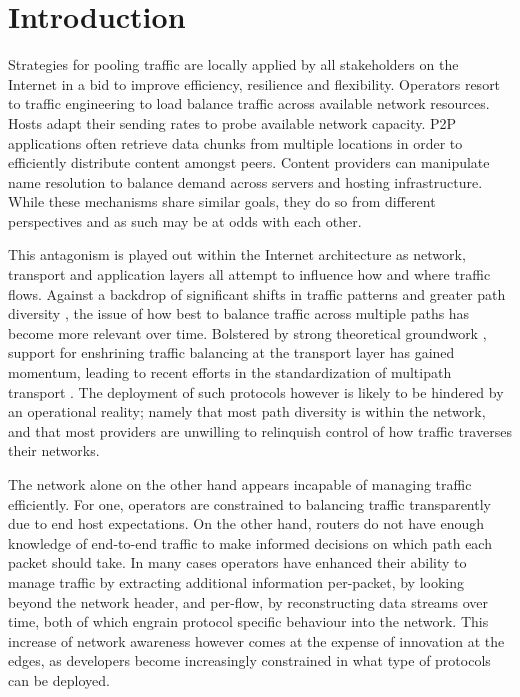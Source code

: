 \chapter{Introduction}
\label{sec:introduction}

Strategies for pooling traffic are locally applied by all stakeholders on the Internet in a bid to improve efficiency, resilience and flexibility.
Operators resort to traffic engineering to load balance traffic across available network resources. 
Hosts adapt their sending rates to probe available network capacity.
\ac{P2P} applications often retrieve data chunks from multiple locations in order to efficiently distribute content amongst peers.
Content providers can manipulate name resolution to balance demand across servers and hosting infrastructure.
While these mechanisms share similar goals, they do so from different perspectives and as such may be at odds with each other.

This antagonism is played out within the Internet architecture as network, transport and application layers all attempt to influence how and where traffic flows.
Against a backdrop of significant shifts in traffic patterns \cite{Cho:2006p104,Cho:2008p488} and greater path diversity \cite{Teixeira:2003p132,Bennett:1999p120,Oliveira:2006p342}, the issue of how best to balance traffic across multiple paths has become more relevant over time.
Bolstered by strong theoretical groundwork \cite{Kelly:2005p140,Key:2007p130}, support for enshrining traffic balancing at the transport layer has gained momentum, leading to recent efforts in the standardization of multipath transport \cite{Ford:2011p490}.
The deployment of such protocols however is likely to be hindered by an operational reality; namely that most path diversity is within the network, and that most providers are unwilling to relinquish control of how traffic traverses their networks.

The network alone on the other hand appears incapable of managing traffic efficiently.
For one, operators are constrained to balancing traffic transparently due to end host expectations.
On the other hand, routers do not have enough knowledge of end-to-end traffic to make informed decisions on which path each packet should take.
In many cases operators have enhanced their ability to manage traffic by extracting additional information per-packet, by looking beyond the network header, and per-flow, by reconstructing data streams over time, both of which engrain protocol specific behaviour into the network.
This increase of network awareness however comes at the expense of innovation at the edges, as developers become increasingly constrained in what type of protocols can be deployed.

